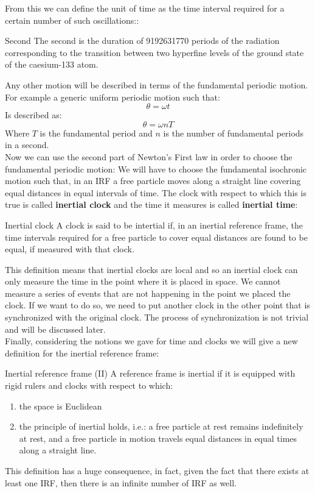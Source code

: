 From this we can define the unit of time as the time interval required for a certain number of such oscillations::
\begin{definition}{Second}
  The second is the duration of 9192631770 periods of the radiation corresponding to the transition between two hyperfine levels of the ground state of the caesium-133 atom.
\end{definition}
Any other motion will be described in terms of the fundamental periodic motion. For example a generic uniform periodic motion such that:
\begin{equation}
  \theta = \omega t
\end{equation}
Is described as:
\begin{equation}
  \theta = \omega n T
\end{equation}
Where $T$ is the fundamental period and $n$ is the number of fundamental periods in a second.\\
Now we can use the second part of Newton's First law in order to choose the fundamental periodic motion:
We will have to choose the fundamental isochronic motion such that, in an IRF a free particle moves along a straight line covering equal distances in equal intervals of time. The clock with respect to which this is true is called \textbf{inertial clock} and the time it measures is called \textbf{inertial time}:
\begin{definition}{Inertial clock}
  A clock is said to be intertial if, in an inertial reference frame, the time intervals required for a free particle to cover equal distances are found to be equal, if measured with that clock.
\end{definition}
This definition means that inertial clocks are local and so an inertial clock can only measure the time in the point where it is placed in space. We cannot measure a series of events that are not happening in the point we placed the clock. If we want to do so, we need to put another clock in the other point that is synchronized with the original clock. The process of synchronization is not trivial and will be discussed later.\\
Finally, considering the notions we gave for time and clocks we will give a new definition for the inertial reference frame:
\begin{definition}{Inertial reference frame (II)}
  A reference frame is inertial if it is equipped with rigid rulers and clocks with respect to which:
  \begin{enumerate}
    \item the space is Euclidean
    \item the principle of inertial holds, i.e.: a free particle at rest remains indefinitely at rest, and a free particle in motion travels equal distances in equal times along a straight line.
  \end{enumerate}
\end{definition}
This definition has a huge consequence, in fact, given the fact that there exists at least one IRF, then there is an infinite number of IRF as well.

